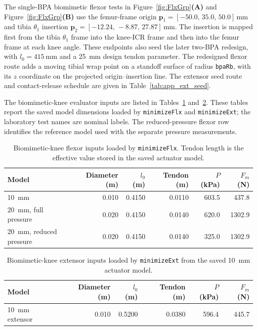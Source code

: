 The single-BPA biomimetic flexor tests in Figure~\ref{fig:FlxGrp}\textbf{(A)} and Figure~\ref{fig:FlxGrp}\textbf{(B)} use the femur-frame origin $\mathbf{p}_1=[-50.0,\,35.0,\,50.0]\,\unit{\mm}$ and tibia $\theta_1$ insertion $\mathbf{p}_2=[-12.24,\,-8.87,\,27.87]\,\unit{\mm}$. The insertion is mapped first from the tibia $\theta_1$ frame into the knee-ICR frame and then into the femur frame at each knee angle. These endpoints also seed the later two-BPA redesign, with $l_0=\qty{415}{\mm}$ and a \qty{25}{\mm} design tendon parameter. The redesigned flexor route adds a moving tibial wrap point on a standoff surface of radius \texttt{bpaRb}, with its $z$ coordinate on the projected origin--insertion line. The extensor seed route and contact-release schedule are given in Table~\ref{tab:app_ext_seed}.

The biomimetic-knee evaluator inputs are listed in Tables~\ref{tab:app_flxbio_tests} and~\ref{tab:app_extbio_tests}. These tables report the saved model dimensions loaded by \texttt{minimizeFlx} and \texttt{minimizeExt}; the laboratory test names are nominal labels. The reduced-pressure flexor row identifies the reference model used with the separate pressure measurements.

\begin{table}[htbp]
\centering\small
\caption{Biomimetic-knee flexor inputs loaded by \texttt{minimizeFlx}. Tendon length is the effective value stored in the saved actuator model.}
\label{tab:app_flxbio_tests}
\begin{tabular}{lrrrrr}
\toprule
Model & Diameter (\unit{\meter}) & $l_0$ (\unit{\meter}) & Tendon (\unit{\meter}) & $P$ (\unit{\kPa}) & $F_m$ (\unit{\newton}) \\
\midrule
\qty{10}{\mm} & 0.010 & 0.4150 & 0.0110 & 603.5 & 437.8 \\
\qty{20}{\mm}, full pressure & 0.020 & 0.4150 & 0.0140 & 620.0 & 1302.9 \\
\qty{20}{\mm}, reduced pressure & 0.020 & 0.4150 & 0.0140 & 325.0 & 1302.9 \\
\bottomrule
\end{tabular}
\end{table}

\begin{table}[htbp]
\centering\small
\caption{Biomimetic-knee extensor inputs loaded by \texttt{minimizeExt} from the saved \qty{10}{\mm} actuator model.}
\label{tab:app_extbio_tests}
\begin{tabular}{lrrrrr}
\toprule
Model & Diameter (\unit{\meter}) & $l_0$ (\unit{\meter}) & Tendon (\unit{\meter}) & $P$ (\unit{\kPa}) & $F_m$ (\unit{\newton}) \\
\midrule
\qty{10}{\mm} extensor & 0.010 & 0.5200 & 0.0380 & 596.4 & 445.7 \\
\bottomrule
\end{tabular}
\end{table}

